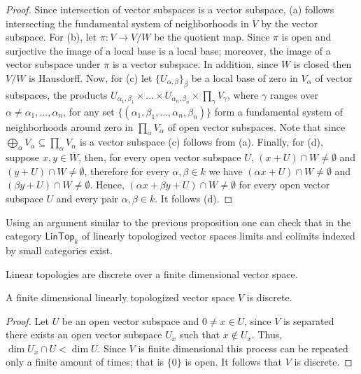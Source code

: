 \begin{proof}
	Since intersection of vector subspaces is a vector subspace, (a) follows intersecting the fundamental system of neighborhoods in $V$ by the vector subspace. For (b), let $\pi\colon V \to V/W$ be the quotient map. Since $\pi$ is open and surjective the image of a local base is a local base; moreover, the image of a vector subspace under $\pi$ is a vector subspace. In addition, since $W$ is closed then $V/W$ is Hausdorff.  Now, for (c) let $\{U_{\alpha, \beta}\}_{\beta}$ be a local base of zero in $V_{\alpha}$ of vector subspaces, the products $U_{\alpha_{1}, \beta_{1}} \times \ldots \times U_{\alpha_{n}, \beta_{n}} \times \prod_{\gamma} V_{\gamma}$, where $\gamma$ ranges over $\alpha \neq \alpha_{1}, \ldots, \alpha_{n}$, for any set $\{(\alpha_{1}, \beta_{1}, \ldots, \alpha_{n}, \beta_{n})\}$ form a fundamental system of neighborhoods around zero in $\prod_{\alpha} V_{\alpha}$ of open vector subspaces. Note that since $\bigoplus_{\alpha} V_{\alpha} \subseteq \prod_{\alpha} V_{\alpha}$ is a vector subspace (c) follows from (a). Finally, for (d), suppose $x,y\in \overline{W}$, then, for every open vector subspace $U$, $(x + U)\cap W \neq \emptyset$ and $(y + U)\cap W \neq \emptyset$, therefore for every $\alpha, \beta \in k$ we have $(\alpha x + U)\cap W \neq \emptyset$ and $(\beta y + U)\cap W \neq \emptyset$. Hence, $(\alpha x + \beta y + U)\cap W\neq \emptyset$ for every open vector subspace $U$ and every pair $\alpha, \beta\in k$. It follows (d).
\end{proof}
\begin{remark}\label{rem:limits-and-colimits-in-lintop-category}
	Using an argument similar to the previous proposition one can check that in the category $\mathsf{LinTop}_k$ of linearly topologized vector spaces limits and colimits indexed by small categories exist.
\end{remark}
Linear topologies are discrete over a finite dimensional vector space.
\begin{proposition}\label{prop:finite_dimensional_linear_topologies}
A finite dimensional linearly topologized vector space $V$ is discrete.
\end{proposition}
\begin{proof}
	Let $U$ be an open vector subspace and $0 \neq x \in U$, since $V$ is separated there exists an open vector subspace $U_{x}$ such that $x \not\in U_{x}$. Thus, $\dim U_{x} \cap U < \dim U$. Since $V$ is finite dimensional this process can be repeated only a finite amount of times; that is $\{0\}$ is open. It follows that $V$ is discrete.
\end{proof}
